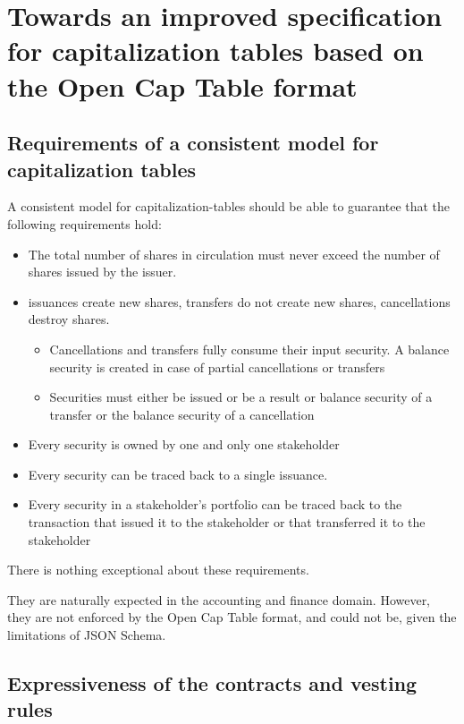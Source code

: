 

\chapter{Towards an improved specification for capitalization tables based on the Open Cap Table format}\label{ch:towards}

\section{Requirements of a consistent model for capitalization tables}

A consistent model for \glspl{capitalization-table} should be able to guarantee that the following requirements hold:

\begin{itemize}
	\item The total number of shares in circulation must never exceed the number of shares issued by the issuer.
	\item \Glspl{issuance} create new shares, transfers do not create new shares, cancellations destroy shares.
	      \begin{itemize}
		      \item Cancellations and transfers fully consume their input security. A balance \gls{security} is created in case of partial cancellations or transfers
		      \item Securities must either be issued or be a result or balance \gls{security} of a transfer or the balance \gls{security} of a cancellation
	      \end{itemize}
	\item Every \gls{security} is owned by one and only one \gls{stakeholder}
	\item Every \gls{security} can be traced back to a single \gls{issuance}.
	\item Every \gls{security} in a \gls{stakeholder}'s portfolio can be traced back to the transaction that issued it to the \gls{stakeholder} or that transferred it to the \gls{stakeholder}
\end{itemize}

There is nothing exceptional about these requirements.

They are naturally expected in the accounting and finance domain. However, they are not enforced by the Open Cap Table format, and could not be, given the limitations of JSON Schema.

\section{Expressiveness of the contracts and vesting rules}

